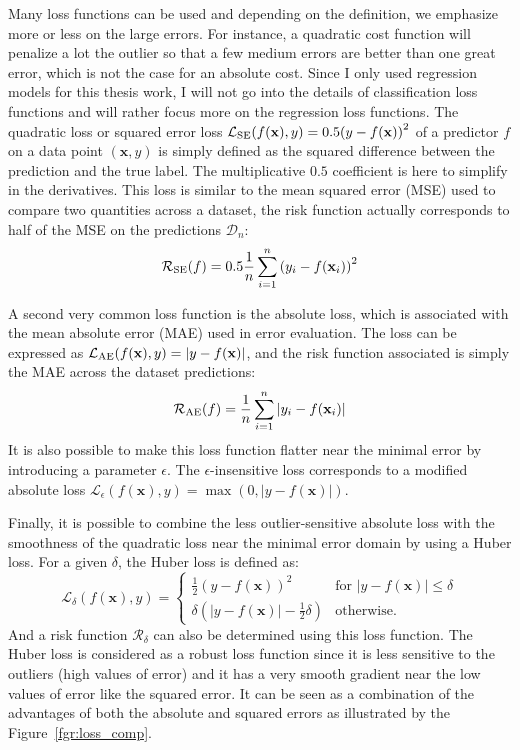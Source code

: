 \documentclass[main]{subfiles}
\begin{document}
Many loss functions can be used and depending on the definition, we emphasize more or less on the large errors. For instance, a quadratic cost function will penalize a lot the outlier so that a few medium errors are better than one great error, which is not the case for an absolute cost. Since I only used regression models for this thesis work, I will not go into the details of classification loss functions and will rather focus more on the regression loss functions. The quadratic loss or squared error loss $\mathcal{L}_{\text{SE}}(f(\mathbf{x}),y)=0.5{\left(y-f(\mathbf{x})\right)}^2$ of a predictor $f$ on a data point $(\mathbf{x},y)$ is simply defined as the squared difference between the prediction and the true label. The multiplicative $0.5$ coefficient is here to simplify in the derivatives. This loss is similar to the mean squared error (MSE) used to compare two quantities across a dataset, the risk function actually corresponds to half of the MSE on the predictions $\mathcal{D}_n$:
\begin{equation}
  \mathcal{R}_{\text{SE}}(f) = 0.5\frac{1}{n}\sum_{i=1}^n {\left(y_i-f(\mathbf{x}_i)\right)}^2
\end{equation}

A second very common loss function is the absolute loss, which is associated with the mean absolute error (MAE) used in error evaluation. The loss can be expressed as $\mathcal{L}_{\text{AE}}(f(\mathbf{x}),y)=\left|y-f(\mathbf{x})\right|$, and the risk function associated is simply the MAE across the dataset predictions:
\begin{equation}
  \mathcal{R}_{\text{AE}}(f) = \frac{1}{n}\sum_{i=1}^n \left|y_i-f(\mathbf{x}_i)\right|
\end{equation}
It is also possible to make this loss function flatter near the minimal error by introducing a parameter $\epsilon$. The $\epsilon$-insensitive loss corresponds to a modified absolute loss $\mathcal{L}_{\epsilon}(f(\mathbf{x}),y)=\max\left(0,\left|y-f(\mathbf{x})\right|\right)$.

Finally, it is possible to combine the less outlier-sensitive absolute loss with the smoothness of the quadratic loss near the minimal error domain by using a Huber loss. For a given $\delta$, the Huber loss is defined as:
\begin{equation}
  \mathcal{L}_{\delta}(f(\mathbf{x}),y) = \left\{
    \begin{array}{ll}
        \tfrac{1}{2}{\left(y-f(\mathbf{x})\right)}^2 & \mbox{for } \left|y-f(\mathbf{x})\right| \leq \delta \\
        \delta\left(\left|y-f(\mathbf{x})\right| - \tfrac{1}{2}\delta\right) & \mbox{otherwise.}
    \end{array}
  \right.
\end{equation}
And a risk function $\mathcal{R}_{\delta}$ can also be determined using this loss function. The Huber loss is considered as a robust loss function since it is less sensitive to the outliers (high values of error) and it has a very smooth gradient near the low values of error like the squared error. It can be seen as a combination of the advantages of both the absolute and squared errors as illustrated by the Figure~\ref{fgr:loss_comp}.
\end{document}
